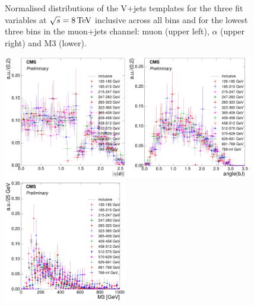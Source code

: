 \begin{figure}[hbtp]
	 \caption{Normalised distributions of the V+jets templates for the three fit variables at $\sqrt{s}=8\,\text{Te\hspace{-.08em}V}$
	 inclusive across all \met bins and for the lowest three \met bins in the muon+jets channel: muon
	 \abseta (upper left), $\alpha$ (upper right) and M3 (lower).}
     \label{fig:MET_fit_variable_vjets_comparisons_muon_8TeV}
\end{figure}

\begin{figure}[hbtp]
    \centering
     \includegraphics[width=0.48\textwidth]{Chapters/04_Analysis/04b_XSections/images/8TeV/fit_variables/electron/HT/electron_absolute_eta/vjets/HT_electron_absolute_eta_2orMoreBtags_VJets_template_comparison.pdf}\hfill
     \includegraphics[width=0.48\textwidth]{Chapters/04_Analysis/04b_XSections/images/8TeV/fit_variables/electron/HT/angle_bl/vjets/HT_angle_bl_2orMoreBtags_VJets_template_comparison.pdf}\hfill
     \includegraphics[width=0.48\textwidth]{Chapters/04_Analysis/04b_XSections/images/8TeV/fit_variables/electron/HT/M3/vjets/HT_M3_2orMoreBtags_VJets_template_comparison.pdf}\\

\end{figure}
